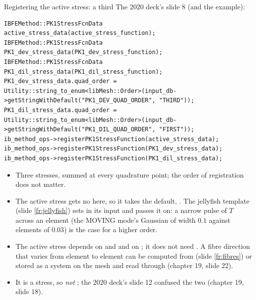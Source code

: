 \documentclass[aspectratio=169,11pt]{beamer}
\begin{document}
\begin{frame}[fragile]{Registering the active stress: a third }
\label{fr:register}
\footnotesize
The 2020 deck's slide 8 (and the example):
\begin{lstlisting}[style=cpptiny]
IBFEMethod::PK1StressFcnData active_stress_data(active_stress_function);
IBFEMethod::PK1StressFcnData PK1_dev_stress_data(PK1_dev_stress_function);
IBFEMethod::PK1StressFcnData PK1_dil_stress_data(PK1_dil_stress_function);
PK1_dev_stress_data.quad_order = Utility::string_to_enum<libMesh::Order>(input_db->getStringWithDefault("PK1_DEV_QUAD_ORDER", "THIRD"));
PK1_dil_stress_data.quad_order = Utility::string_to_enum<libMesh::Order>(input_db->getStringWithDefault("PK1_DIL_QUAD_ORDER", "FIRST"));
ib_method_ops->registerPK1StressFunction(active_stress_data);
ib_method_ops->registerPK1StressFunction(PK1_dev_stress_data);
ib_method_ops->registerPK1StressFunction(PK1_dil_stress_data);
\end{lstlisting}
\begin{itemize}
  \item Three stresses, summed at every quadrature point; the order of registration does not matter.
  \item The active stress gets no  here, so it takes the default, . The jellyfish template (slide \ref{fr:jellyfish}) sets  in its input and passes it on: a narrow pulse of $T$ across an element (the MOVING mode's Gaussian of width $0.1$ against elements of $0.03$) is the case for a higher order.
  \item The active stress depends on  and  and on ; it does not need . A fibre direction that varies from element to element can be computed from  (slide \ref{fr:fibres}) or stored as a system on the mesh and read through  (chapter 19, slide 22).
  \item It is a stress, so \emph{not} ; the 2020 deck's slide 12 confused the two (chapter 19, slide 18).
\end{itemize}
\end{frame}
\end{document}

